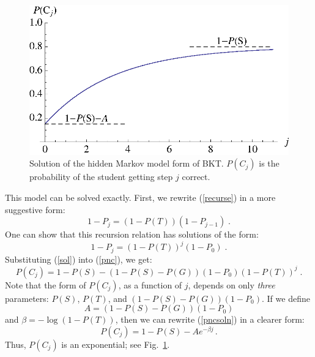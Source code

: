 \documentclass{acmlarge-edm}
\begin{document}
\begin{figure}
\centering\includegraphics{exponential.eps}
\caption{Solution of the hidden Markov model form of BKT. 
          $P(C_j)$ is the probability of  the student getting step $j$ correct.}
\label{bktgraph}
\end{figure}

This model can be  solved exactly.  First, we rewrite (\ref{recurse}) in a
more suggestive form:
%
\begin{equation}
        1-P_j = \left(1-P(T)\right) \left(1-P_{j-1}\right) \; .
\end{equation}
%
One can show that this recursion relation has solutions of the form:
%
\begin{equation}
            1-P_j = \left(1-P(T)\right)^j\left(1-P_0\right) \; .
	    \label{sol}
\end{equation}
%
%
Substituting (\ref{sol}) into (\ref{pnc}), we get:
%
\begin{equation}
        P(C_j) = 1-P(S) -\left(1-P(S)-P(G)\right) \left(1-P_0\right)
                   \left(1-P(T)\right)^j \; . \label{pncsoln}
\end{equation}
%
Note that the form of $P(C_j)$, as a function of $j$, 
depends on only {\em three} parameters:  $P(S)$, $P(T)$, and 
$\left(1-P(S)-P(G)\right) \left(1-P_0\right)$.
If we define
%
\begin{equation} 
          A=\left(1-P(S)-P(G)\right) \left(1-P_0\right)  \label{aa}
\end{equation}
%
 and $\beta=-\log(1-P(T))$, then we can rewrite (\ref{pncsoln}) in 
a clearer form:
%
\begin{equation}
         P(C_j) = 1-P(S) -A e^{-\beta j} \, .
\end{equation}
%
Thus, $P(C_j)$ is an exponential; see Fig.~\ref{bktgraph}.
\end{document}
